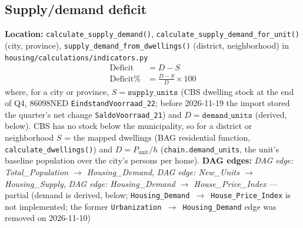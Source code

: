 \documentclass[11pt]{article}
\newcommand{\code}[1]{\texttt{#1}}
\newcommand{\dagedge}[1]{\textit{DAG edge: #1}}
\newcommand{\statuspartial}{\textcolor{orange!80!black}{partial}}
\begin{document}
\subsection{Supply/demand deficit}
\textbf{Location:} \code{calculate\_supply\_demand()}, \code{calculate\_supply\_demand\_for\_unit()} (city, province), \code{supply\_demand\_from\_dwellings()} (district, neighborhood) in \code{housing/calculations/indicators.py}
\begin{align}
  \text{Deficit} &= D - S \\
  \text{Deficit\%} &= \frac{D - S}{D} \times 100
\end{align}
where, for a city or province, $S = \texttt{supply\_units}$ (CBS dwelling stock at the end of Q4, 86098NED \code{EindstandVoorraad\_22}; before 2026-11-19 the import stored the quarter's net change \code{SaldoVoorraad\_21}) and $D = \texttt{demand\_units}$ (derived, below). CBS has no stock below the municipality, so for a district or neighborhood $S$ = the mapped dwellings (BAG residential function, \code{calculate\_dwellings()}) and $D = P_{\text{unit}} / h$ (\code{chain.demand\_units}, the unit's baseline population over the city's persons per home). \textbf{DAG edges:} \dagedge{Total\_Population $\rightarrow$ Housing\_Demand}, \dagedge{New\_Units $\rightarrow$ Housing\_Supply}, \dagedge{Housing\_Demand $\rightarrow$ House\_Price\_Index} --- \statuspartial{} (demand is derived, below; \code{Housing\_Demand $\rightarrow$ House\_Price\_Index} is not implemented; the former \code{Urbanization $\rightarrow$ Housing\_Demand} edge was removed on 2026-11-10)
\end{document}
